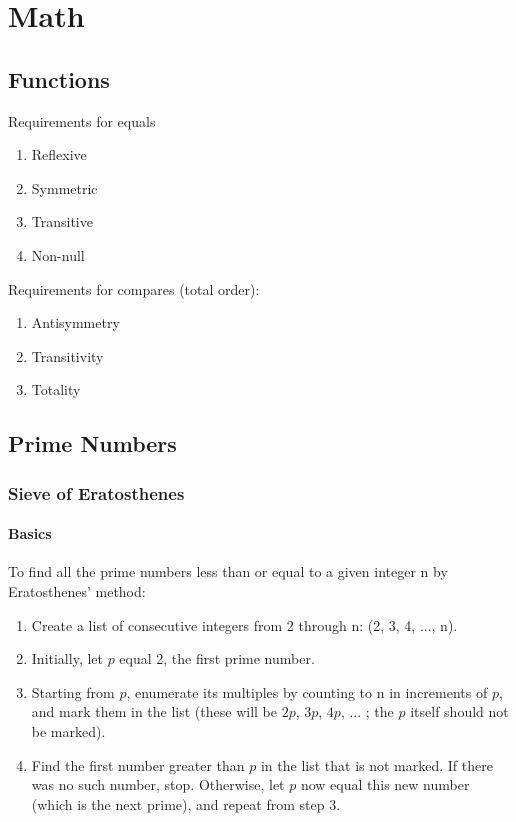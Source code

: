 \chapter{Math}

\section{Functions}
 Requirements for equals
\begin{enumerate}
\item Reflexive
\item Symmetric
\item Transitive
\item Non-null
\end{enumerate}
 Requirements for compares (total order):
\begin{enumerate}
\item Antisymmetry
\item Transitivity
\item Totality
\end{enumerate}

\section{Prime Numbers}
\subsection{Sieve of Eratosthenes}
\subsubsection{Basics}
To find all the prime numbers less than or equal to a given integer n by Eratosthenes' method:
\begin{enumerate}
\item Create a list of consecutive integers from 2 through n: (2, 3, 4, ..., n).
\item Initially, let $p$ equal 2, the first prime number.
\item Starting from $p$, enumerate its multiples by counting to n in increments of $p$, and mark them in the list (these will be $2p$, $3p$, $4p$, ... ; the $p$ itself should not be marked).
\item Find the first number greater than $p$ in the list that is not marked. If there was no such number, stop. Otherwise, let $p$ now equal this new number (which is the next prime), and repeat from step 3.
\end{enumerate}

